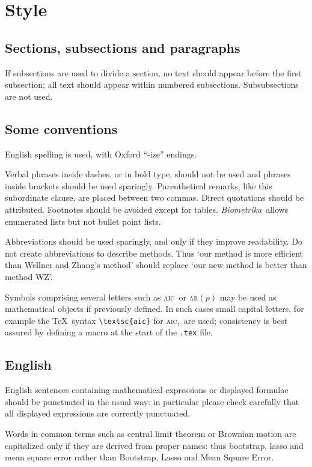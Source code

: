 \documentclass[lineno]{biometrika}
\def\Bka{{\it Biometrika}}
\def\AIC{\textsc{aic}}
\begin{document}
\section{Style}

\subsection{Sections, subsections and paragraphs}

If subsections are used to divide a section, no text should appear before the first subsection; all text should appear within numbered subsections.  Subsubsections are not used.

\subsection{Some conventions}

English spelling is used, with Oxford ``-ize'' endings.

Verbal phrases inside dashes, or in  bold type, should not be used  and phrases inside brackets should be used sparingly. Parenthetical remarks, like this subordinate clause, are placed between two commas. Direct quotations should be attributed. Footnotes should be avoided except for tables. \Bka\  allows enumerated lists but not bullet point lists. 


Abbreviations should be used sparingly, and only if they improve readability. 
Do not create abbreviations to describe methods. Thus `our method is more efficient than Wellner and Zhang's method' should replace `our new method is better than method WZ'.


Symbols comprising several letters such as \AIC\ or \textsc{ar}$(p)$ may be used as mathematical objects if previously defined.   In such cases small capital letters, for example the  \TeX\ syntax \verb+\textsc{aic}+ for \AIC,\ are used; consistency is best assured by defining a macro at the start of the \texttt{.tex}  file.

\subsection{English}

English sentences containing mathematical expressions or displayed formulae should be punctuated in the usual way: in particular please check carefully that all displayed expressions are correctly punctuated.  

Words in common terms such as central limit theorem or Brownian motion are capitalized only if they are derived from proper names: thus bootstrap,  lasso and mean square error rather than Bootstrap, Lasso and  Mean Square Error.
 
\end{document}

